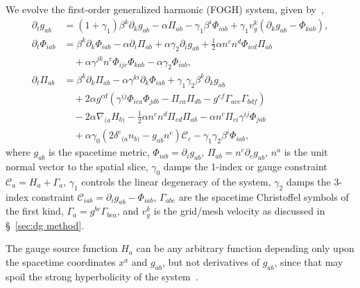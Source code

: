 \begin{bibunit}[unsrtnat]
We evolve the first-order generalized harmonic (FOGH) system, given
by~\cite{Lindblom:2005qh},
\begin{align}
  \label{eq:fosh gh metric evolution}
  \partial_t g_{ab}
  &=\left(1+\gamma_1\right)\beta^k\partial_k g_{ab}
    -\alpha \Pi_{ab}-\gamma_1\beta^i\Phi_{iab}
    +\gamma_1v^k_g\left(\partial_k g_{ab}-\Phi_{kab}\right), \\
  \label{eq:fosh gh metric derivative evolution}
  \partial_t\Phi_{iab}
  &=\beta^k\partial_k\Phi_{iab} - \alpha \partial_i\Pi_{ab}
    + \alpha \gamma_2\partial_ig_{ab}
    +\frac{1}{2}\alpha n^c n^d\Phi_{icd}\Pi_{ab} \nonumber \\
  &\quad+ \alpha \gamma^{jk}n^c\Phi_{ijc}\Phi_{kab}
    -\alpha \gamma_2\Phi_{iab},\\
  \label{eq:fosh gh metric conjugate evolution}
  \partial_t\Pi_{ab}
  &=\beta^k\partial_k\Pi_{ab} - \alpha \gamma^{ki}\partial_k\Phi_{iab}
    + \gamma_1\gamma_2\beta^k\partial_kg_{ab} \nonumber \\
  &\quad+2\alpha g^{cd}\left(\gamma^{ij}\Phi_{ica}\Phi_{jdb}
    - \Pi_{ca}\Pi_{db} - g^{ef}\Gamma_{ace}\Gamma_{bdf}\right) \nonumber \\
  &\quad-2\alpha \nabla_{(a}H_{b)}
    - \frac{1}{2}\alpha n^c n^d\Pi_{cd}\Pi_{ab}
    - \alpha n^c \Pi_{ci}\gamma^{ij}\Phi_{jab} \nonumber \\
  &\quad+\alpha \gamma_0\left(2\delta^c{}_{(a} n_{b)}
    - g_{ab}n^c\right)\mathcal{C}_c -\gamma_1\gamma_2 \beta^i\Phi_{iab},
\end{align}
where $g_{ab}$ is the spacetime metric, $\Phi_{iab}=\partial_i g_{ab}$,
$\Pi_{ab} = n^c\partial_cg_{ab}$, $n^a$ is the unit normal vector to the spatial
slice, $\gamma_0$ damps the 1-index or gauge constraint
$\mathcal{C}_a=H_a+\Gamma_a$, $\gamma_1$ controls the linear degeneracy of the
system, $\gamma_2$ damps the 3-index constraint
$\mathcal{C}_{iab}=\partial_i g_{ab}-\Phi_{iab}$, $\Gamma_{abc}$ are the
spacetime Christoffel symbols of the first kind, $\Gamma_a=g^{bc}\Gamma_{bca}$,
and $v^k_g$ is the grid/mesh velocity as discussed in \S~\ref{sec:dg method}.

The gauge source function $H_a$ can be any arbitrary function depending only
upon the spacetime coordinates $x^a$ and $g_{ab}$, but not derivatives of
$g_{ab}$, since that may spoil the strong hyperbolicity of the
system~\cite{Lindblom:2007xw, Szilagyi:2009qz}.


\end{bibunit}
